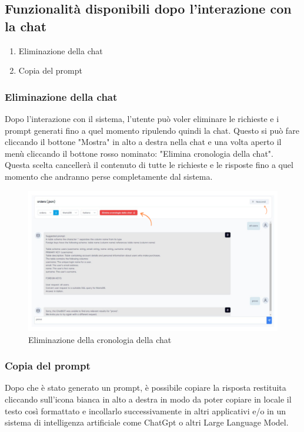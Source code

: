 \subsection{Funzionalità disponibili dopo l'interazione con la chat}

\begin{enumerate}
  \item Eliminazione della chat
  \item Copia del prompt
\end{enumerate}

\subsubsection{Eliminazione della chat}

Dopo l'interazione con il sistema, l'utente può voler eliminare le richieste e i prompt generati fino a quel momento ripulendo quindi la chat. Questo si può fare cliccando il bottone "Mostra" in alto a destra nella chat e una volta aperto il menù cliccando il bottone rosso nominato: "Elimina cronologia della chat". Questa scelta cancellerà il contenuto di tutte le richieste e le risposte fino a quel momento che andranno perse completamente dal sistema.

\begin{figure}[H]
  \centering
  \includegraphics[width=1\textwidth]{assets/elimina_chat.png}
  \caption{Eliminazione della cronologia della chat}
\end{figure}

\subsubsection{Copia del prompt}

Dopo che è stato generato un prompt, è possibile copiare la risposta restituita cliccando sull'icona bianca in alto a destra in modo da poter copiare in locale il testo così formattato e incollarlo successivamente in altri applicativi e/o in un sistema di intelligenza artificiale come ChatGpt o altri Large Language Model.

